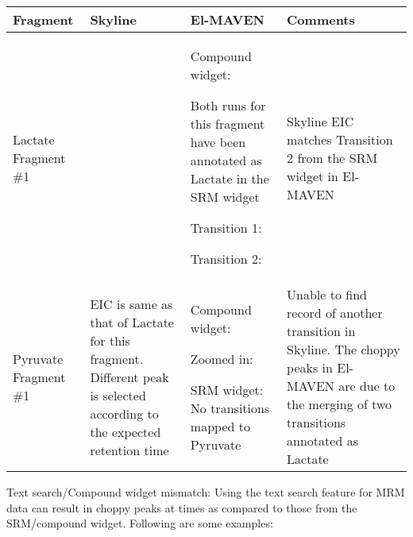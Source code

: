 \documentclass[letterpaper,10pt,english,openany,oneside]{sphinxmanual}
\begin{document}
\begin{savenotes}\sphinxattablestart
\centering
\begin{tabulary}{\linewidth}[t]{|T|T|T|T|}
\hline
\sphinxstyletheadfamily 
Fragment
&\sphinxstyletheadfamily 
Skyline
&\sphinxstyletheadfamily 
El-MAVEN
&\sphinxstyletheadfamily 
Comments
\\
\hline
Lactate
Fragment \#1
&
&
Compound widget:


Both runs for this
fragment have been
annotated as
Lactate in the SRM
widget

Transition 1:


Transition 2:

&
Skyline EIC matches
Transition 2 from
the SRM widget in
El-MAVEN
\\
\hline
Pyruvate
Fragment \#1
&
EIC is same as
that of Lactate
for this fragment.
Different peak is
selected according
to the expected
retention time

&
Compound widget:


Zoomed in:


SRM widget:
No transitions
mapped to
Pyruvate
&
Unable to find
record of another
transition in
Skyline. The choppy
peaks in El-MAVEN
are due to the
merging of two
transitions
annotated as
Lactate
\\
\hline
\end{tabulary}
\par
\sphinxattableend\end{savenotes}

Text search/Compound widget mismatch: Using the text search feature for MRM data can result in choppy peaks at times as compared to those from the SRM/compound widget. Following are some examples:
\end{document}
